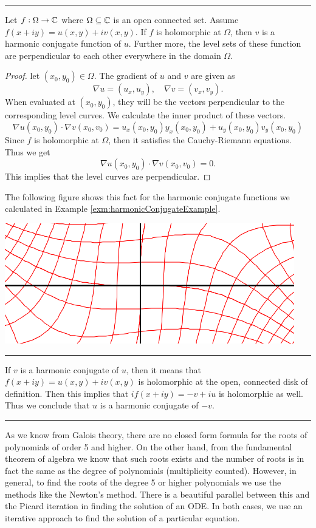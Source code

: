 \hrule

\begin{fact}
	Let $f: \Omega \to \mathbb{C}$ where $\Omega \subseteq \mathbb{C}$ is an open connected set. Assume $f(x+iy) = u(x,y) + i v(x,y)$. If $f$ is holomorphic at $\Omega$, then $v$ is a harmonic conjugate function of $u$. Further more, the level sets of these function are perpendicular to each other everywhere in the domain $\Omega$.
\end{fact}

\begin{proof}
	let $(x_0,y_0) \in \Omega$. The gradient of $u$ and $v$ are given as
	\[ \nabla u = (u_x, u_y), \quad \nabla v = (v_x, v_y). \]
	When evaluated at $(x_0, y_0)$, they will be the vectors perpendicular to the corresponding level curves. We calculate the inner product of these vectors.
	\[ \nabla u (x_0, y_0) \cdot \nabla v(x_0, v_0) = u_x(x_0,y_0) y_x(x_0, y_0) + u_y(x_0, y_0) v_y(x_0, y_0) \]
	Since $f$ is holomorphic at $\Omega$, then it satisfies the Cauchy-Riemann equations. Thus we get 
	\[ \nabla u (x_0, y_0) \cdot \nabla v(x_0, v_0) = 0. \] 
	This implies that the level curves are perpendicular.
\end{proof}
The following figure shows this fact for the harmonic conjugate functions we calculated in Example \autoref{exm:harmonicConjugateExample}.
\begin{center}
	\includegraphics[scale=0.5]{Images/HarmonicConjugate.png}
\end{center}


\hrule

\begin{fact}
	If $v$ is a harmonic conjugate of $u$, then it means that $f(x+iy)=u(x,y) + i v(x,y)$ is holomorphic at the open, connected disk of definition. Then this implies that $if(x+iy)=-v + iu$ is holomorphic as well. Thus we conclude that $u$ is a harmonic conjugate of $-v$.
\end{fact}

\hrule
\begin{fact}
	As we know from Galois theory, there are no closed form formula for the roots of polynomials of order 5 and higher. On the other hand, from the fundamental theorem of algebra we know that such roots exists and the number of roots is in fact the same as the degree of polynomials (multiplicity counted). However, in general, to find the roots of the degree 5 or higher polynomials we use the methods like the Newton's method. There is a beautiful parallel between this and the Picard iteration in finding the solution of an ODE. In both cases, we use an iterative approach to find the solution of a particular equation.
\end{fact}
